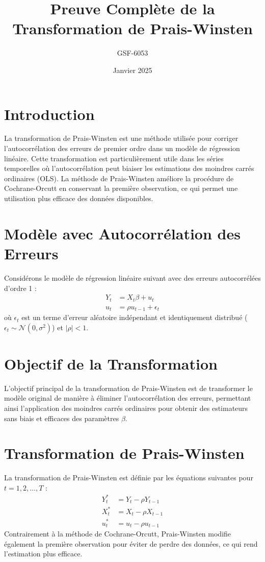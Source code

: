 \documentclass[14pt]{extarticle} %
\title{\textbf{Preuve Complète de la Transformation de Prais-Winsten}}
\author{GSF-6053}
\date{Janvier 2025}
\theoremstyle{definition}
\theoremstyle{plain}
\begin{document}
\maketitle

\tableofcontents

\newpage

\section{Introduction}
La transformation de Prais-Winsten est une méthode utilisée pour corriger l'autocorrélation des erreurs de premier ordre dans un modèle de régression linéaire. Cette transformation est particulièrement utile dans les séries temporelles où l'autocorrélation peut biaiser les estimations des moindres carrés ordinaires (OLS). La méthode de Prais-Winsten améliore la procédure de Cochrane-Orcutt en conservant la première observation, ce qui permet une utilisation plus efficace des données disponibles.

\section{Modèle avec Autocorrélation des Erreurs}
Considérons le modèle de régression linéaire suivant avec des erreurs autocorrélées d'ordre 1 :
\begin{align}
Y_t &= X_t \beta + u_t \label{eq:model_original} \\
u_t &= \rho u_{t-1} + \epsilon_t \label{eq:autocorr_error}
\end{align}
où \( \epsilon_t \) est un terme d'erreur aléatoire indépendant et identiquement distribué (\( \epsilon_t \sim \mathcal{N}(0, \sigma^2) \)) et \( |\rho| < 1 \).

\section{Objectif de la Transformation}
L'objectif principal de la transformation de Prais-Winsten est de transformer le modèle original de manière à éliminer l'autocorrélation des erreurs, permettant ainsi l'application des moindres carrés ordinaires pour obtenir des estimateurs sans biais et efficaces des paramètres \( \beta \).

\section{Transformation de Prais-Winsten}
La transformation de Prais-Winsten est définie par les équations suivantes pour \( t = 1, 2, \dots, T \) :
\begin{align}
Y_t^* &= Y_t - \rho Y_{t-1} \\
X_t^* &= X_t - \rho X_{t-1} \\
u_t^* &= u_t - \rho u_{t-1}
\end{align}
Contrairement à la méthode de Cochrane-Orcutt, Prais-Winsten modifie également la première observation pour éviter de perdre des données, ce qui rend l'estimation plus efficace.
\end{document}
